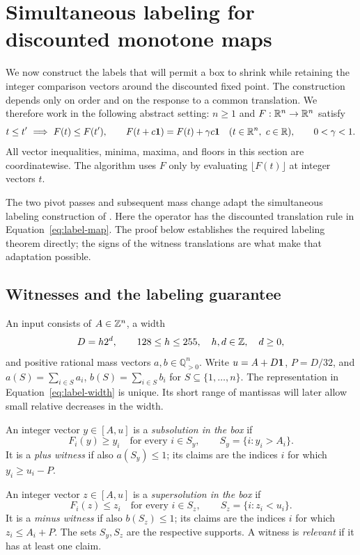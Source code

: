 \section{Simultaneous labeling for discounted monotone maps}
\label{sec:labeling}

We now construct the labels that will permit a box to shrink while
retaining the integer comparison vectors around the discounted fixed
point.  The construction depends only on order and on the response to
a common translation.  We therefore work in the following abstract
setting: $n\ge1$ and $F:\mathbb R^n\to\mathbb R^n$ satisfy
\begin{equation}
 t\le t'\ \Longrightarrow\ F(t)\le F(t'),\qquad
 F(t+c\mathbf 1)=F(t)+\gamma c\mathbf 1
 \quad(t\in\mathbb R^n,\ c\in\mathbb R),\qquad 0<\gamma<1.
 \label{eq:label-map}
\end{equation}
All vector inequalities, minima, maxima, and floors in this section
are coordinatewise.  The algorithm uses $F$ only by evaluating
$\lfloor F(t)\rfloor$ at integer vectors $t$.

The two pivot passes and subsequent mass change adapt the simultaneous
labeling construction of
\cite[Sections~4--5]{OpenAI2026Deterministic}.  Here the operator has
the discounted translation rule in Equation~\eqref{eq:label-map}.
The proof below establishes the required labeling theorem directly;
the signs of the witness translations are what make that adaptation
possible.

\subsection{Witnesses and the labeling guarantee}

An input consists of $A\in\mathbb Z^n$, a width
\begin{equation}
 D=h2^d,\qquad 128\le h\le255,\quad h,d\in\mathbb Z,\quad d\ge0,
 \label{eq:label-width}
\end{equation}
and positive rational mass vectors $a,b\in\mathbb Q_{>0}^n$.
Write $u=A+D\mathbf 1$, $P=D/32$, and
$a(S)=\sum_{i\in S}a_i$, $b(S)=\sum_{i\in S}b_i$ for
$S\subseteq\{1,\ldots,n\}$.  The representation in
Equation~\eqref{eq:label-width} is unique.  Its short range of
mantissas will later allow small relative decreases in the width.

\begin{definition}
\label{def:label-witness}
An integer vector $y\in[A,u]$ is a \emph{subsolution in the box} if
\[
 F_i(y)\ge y_i\quad\text{for every }i\in S_y,
 \qquad S_y=\{i:y_i>A_i\}.
\]
It is a \emph{plus witness} if also $a(S_y)\le1$; its claims are
the indices $i$ for which $y_i\ge u_i-P$.

An integer vector $z\in[A,u]$ is a \emph{supersolution in the box} if
\[
 F_i(z)\le z_i\quad\text{for every }i\in S_z,
 \qquad S_z=\{i:z_i<u_i\}.
\]
It is a \emph{minus witness} if also $b(S_z)\le1$; its claims are
the indices $i$ for which $z_i\le A_i+P$.
The sets $S_y,S_z$ are the respective supports.  A witness is
\emph{relevant} if it has at least one claim.
\end{definition}

